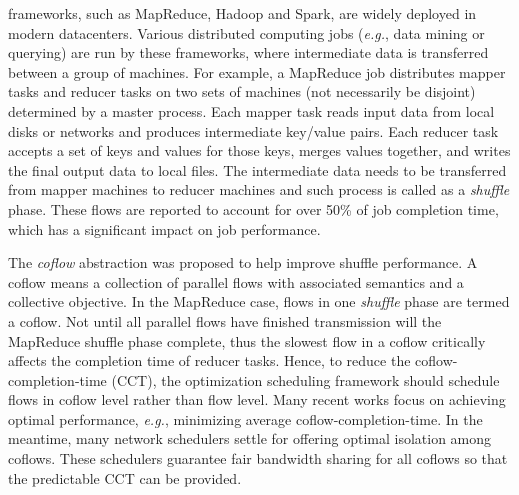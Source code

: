 \documentclass[10pt,journal,compsoc]{IEEEtran}
\begin{document}
\IEEEpeerreviewmaketitle


 frameworks, such as MapReduce\cite{MapReduce}, Hadoop\cite{Hadoop} and Spark\cite{Spark}, are widely deployed in modern datacenters.
%
Various distributed computing jobs (\emph{e.g.}, data mining or querying) are run by these frameworks, where intermediate data is transferred between a group of machines.
%
For example, a MapReduce job distributes mapper tasks and reducer tasks on two sets of machines (not necessarily be disjoint) determined by a master process.
%
Each mapper task reads input data from local disks or networks and produces intermediate key/value pairs.
%
Each reducer task accepts a set of keys and values for those keys, merges values together, and writes the final output data to local files.
%
The intermediate data needs to be transferred from mapper machines to reducer machines and such process is called as a \emph{shuffle} phase.
%
These flows are reported to account for over 50\% of job completion time, which has a significant impact on job performance\cite{orchestra}.

The \emph{coflow} abstraction was proposed to help improve shuffle performance.
%
A coflow means a collection of parallel flows with associated semantics and a collective objective\cite{coflow}.
%
In the MapReduce case, flows in one \emph{shuffle} phase are termed a coflow. %
%
Not until all parallel flows have finished transmission will the MapReduce shuffle phase complete, thus the slowest flow %
in a coflow critically affects the completion time of reducer tasks.
%
Hence, to reduce the coflow-completion-time (CCT), the optimization scheduling framework should schedule flows in coflow level rather than flow level.
%
Many recent works focus on achieving optimal performance, \emph{e.g.}, minimizing average coflow-completion-time\cite{varys,aalo,coda,barrat,stream}. In the meantime, many network schedulers settle for offering optimal isolation among coflows\cite{HUG,DRF,faircloud,fair}.
%
These schedulers guarantee fair bandwidth sharing for all coflows so that the predictable CCT can be provided.
\end{document}
